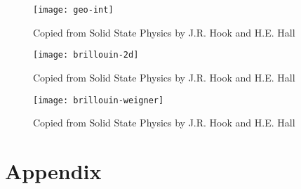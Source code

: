 \documentclass[11pt]{article}
\begin{document}
\begin{figure}[!ht]
	\centering
	\texttt{[image: geo-int]}
	\caption{Copied from Solid State Physics by J.R. Hook and H.E. Hall}
	\label{fig:geo-int}
\end{figure}

\begin{figure}[!ht]
	\centering
	\texttt{[image: brillouin-2d]}
	\caption{Copied from Solid State Physics by J.R. Hook and H.E. Hall}
	\label{fig:brillouin-2d}
\end{figure}

\begin{figure}[!ht]
	\centering
	\texttt{[image: brillouin-weigner]}
	\caption{Copied from Solid State Physics by J.R. Hook and H.E. Hall}
	\label{fig:brillouin-weigner}
\end{figure}

\newpage












\clearpage
\appendix
\section{Appendix}
\end{document}
